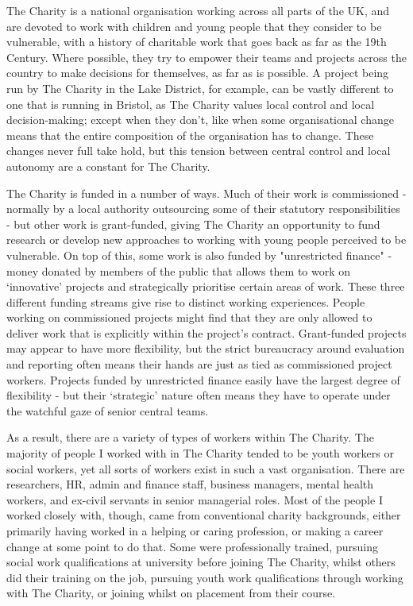 The Charity is a national organisation working across all parts of the UK, and are devoted to work with children and young people that they consider to be vulnerable, with a history of charitable work that goes back as far as the 19th Century. Where possible, they try to empower their teams and projects across the country to make decisions for themselves, as far as is possible. A project being run by The Charity in the Lake District, for example, can be vastly different to one that is running in Bristol, as The Charity values local control and local decision-making; except when they don’t, like when some organisational change means that the entire composition of the organisation has to change. These changes never full take hold, but this tension between central control and local autonomy are a constant for The Charity.

The Charity is funded in a number of ways. Much of their work is commissioned - normally by a local authority outsourcing some of their statutory responsibilities - but other work is grant-funded, giving The Charity an opportunity to fund research or develop new approaches to working with young people perceived to be vulnerable. On top of this, some work is also funded by "unrestricted finance" -  money donated by members of the public that allows them to work on `innovative' projects and strategically prioritise certain areas of work. These three different funding streams give rise to distinct working experiences. People working on commissioned projects might find that they are only allowed to deliver work that is explicitly within the project's contract. Grant-funded projects may appear to have more flexibility, but the strict bureaucracy around evaluation and reporting often means their hands are just as tied as commissioned project workers. Projects funded by unrestricted finance easily have the largest degree of flexibility - but their `strategic' nature often means they have to operate under the watchful gaze of senior central teams. 

As a result, there are a variety of types of workers within The Charity. The majority of people I worked with in The Charity tended to be youth workers or social workers, yet all sorts of workers exist in such a vast organisation. There are researchers, HR, admin and finance staff, business managers, mental health workers, and ex-civil servants in senior managerial roles. Most of the people I worked closely with, though, came from conventional charity backgrounds, either primarily having worked in a helping or caring profession, or making a career change at some point to do that. Some were professionally trained, pursuing social work qualifications at university before joining The Charity, whilst others did their training on the job, pursuing youth work qualifications through working with The Charity, or joining whilst on placement from their course. 

